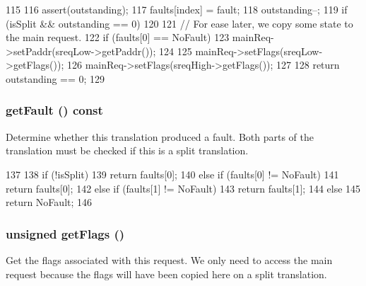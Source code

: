\begin{DoxyCode}
115     {
116         assert(outstanding);
117         faults[index] = fault;
118         outstanding--;
119         if (isSplit && outstanding == 0) {
120 
121             // For ease later, we copy some state to the main request.
122             if (faults[0] == NoFault) {
123                 mainReq->setPaddr(sreqLow->getPaddr());
124             }
125             mainReq->setFlags(sreqLow->getFlags());
126             mainReq->setFlags(sreqHigh->getFlags());
127         }
128         return outstanding == 0;
129     }
\end{DoxyCode}
\hypertarget{classWholeTranslationState_a1ac977937b0a3cf64e58ba7141e4cc11}{
\subsubsection[{getFault}]{ getFault () const}}
\label{classWholeTranslationState_a1ac977937b0a3cf64e58ba7141e4cc11}
Determine whether this translation produced a fault. Both parts of the translation must be checked if this is a split translation. 


\begin{DoxyCode}
137     {
138         if (!isSplit)
139             return faults[0];
140         else if (faults[0] != NoFault)
141             return faults[0];
142         else if (faults[1] != NoFault)
143             return faults[1];
144         else
145             return NoFault;
146     }
\end{DoxyCode}
\hypertarget{classWholeTranslationState_a009220068577b6979aeae8fe951bd63d}{
\subsubsection[{getFlags}]{\setlength{\rightskip}{0pt plus 5cm}unsigned getFlags ()}}
\label{classWholeTranslationState_a009220068577b6979aeae8fe951bd63d}
Get the flags associated with this request. We only need to access the main request because the flags will have been copied here on a split translation. 


